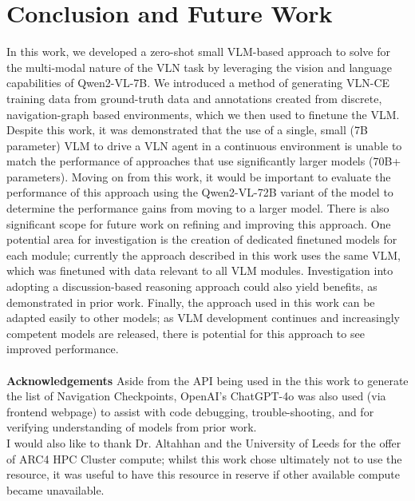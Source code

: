\documentclass{svproc}
\begin{document}
\section{Conclusion and Future Work}
    In this work, we developed a zero-shot small VLM-based approach to solve for the multi-modal nature of the VLN task by leveraging the vision and language capabilities of Qwen2-VL-7B. We introduced a method of generating VLN-CE training data from ground-truth data and annotations created from discrete, navigation-graph based environments, which we then used to finetune the VLM. Despite this work, it was demonstrated that the use of a single, small (7B parameter) VLM to drive a VLN agent in a continuous environment is unable to match the performance of approaches that use significantly larger models (70B+ parameters). Moving on from this work, it would be important to evaluate the performance of this approach using the Qwen2-VL-72B variant of the model to determine the performance gains from moving to a larger model. There is also significant scope for future work on refining and improving this approach. One potential area for investigation is the creation of dedicated finetuned models for each module; currently the approach described in this work uses the same VLM, which was finetuned with data relevant to all VLM modules. Investigation into adopting a discussion-based reasoning approach could also yield benefits, as demonstrated in prior work.
    Finally, the approach used in this work can be adapted easily to other models; as VLM development continues and increasingly competent models are released, there is potential for this approach to see improved performance.
    \\ \\
    \textbf{Acknowledgements}  Aside from the API being used in the this work to generate the list of Navigation Checkpoints, OpenAI's ChatGPT-4o was also used (via frontend webpage) to assist with code debugging, trouble-shooting, and for verifying understanding of models from prior work. \\
    I would also like to thank Dr. Altahhan and the University of Leeds for the offer of ARC4 HPC Cluster compute; whilst this work chose ultimately not to use the resource, it was useful to have this resource in reserve if other available compute became unavailable.

\printbibliography 
\end{document}
